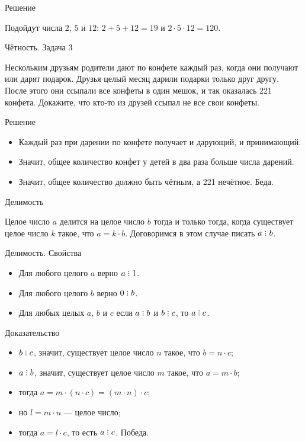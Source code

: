 \documentclass[17pt]{extarticle}
\newcommand{\divsby}{\mathrel{\rlap{.}\rlap{\raisebox{0.55ex}{.}}\raisebox{1.1ex}{.}}}
\newcommand{\newslide}[1]{\newpage \begin{center} \large #1 \end{center}}
\begin{document}
\newslide{Решение}

Подойдут числа $2$, $5$ и $12$: $2+5+12 = 19$ и $2\cdot5\cdot12 = 120$.

\newslide{Чётность. Задача 3}

Нескольким друзьям родители дают по конфете каждый раз, когда они получают или дарят подарок. Друзья целый месяц дарили подарки только друг другу. После этого они ссыпали все конфеты в один мешок, и так оказалась 221 конфета. Докажите, что кто-то из друзей ссыпал не все свои конфеты.

\newslide{Решение}

\begin{itemize}
\item Каждый раз при дарении по конфете получает и дарующий, и принимающий.
\item Значит, общее количество конфет у детей в два раза больше числа дарений.
\item Значит, общее количество должно быть чётным, а 221 нечётное. Беда.
\end{itemize}

\newslide{Делимость}

Целое число $a$ делится на целое число $b$ тогда и только тогда, когда существует целое число $k$ такое, что $a = k\cdot b$. Договоримся в этом случае писать $a \divsby b$.

\newslide{Делимость. Свойства}

\begin{itemize}
\item Для любого целого $a$ верно $a \divsby 1$.
\item Для любого целого $b$ верно $0 \divsby b$.
\item Для любых целых $a$, $b$ и $c$ если $a \divsby b$ и $b \divsby c$, то $a \divsby c$.
\end{itemize}

\newslide{Доказательство}\vspace{-7mm}

\begin{itemize}\itemsep=0mm
\item $b \divsby c$, значит, существует целое число $n$ такое, что $b = n\cdot c$;
\item $a \divsby b$, значит, существует целое число $m$ такое, что $a = m\cdot b$;
\item тогда $a = m\cdot(n\cdot c) = (m\cdot n)\cdot c$;
\item но $l = m\cdot n$ --- целое число;
\item тогда $a = l\cdot c$, то есть $a \divsby c$. Победа.
\end{itemize}
\end{document}
